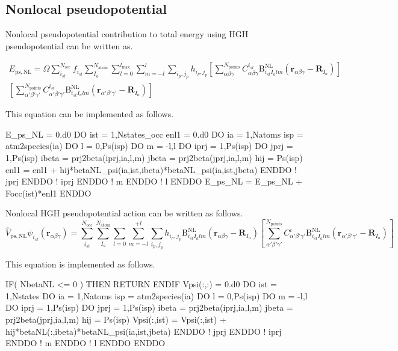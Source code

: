 \subsection{Nonlocal pseudopotential}

Nonlocal pseudopotential contribution to total energy using HGH
pseudopotential can be written as.

\begin{multline}
E_{\mathrm{ps,NL}} = \Omega \sum_{i_{st}}^{N_{\mathrm{occ}}} f_{i_{st}}
\sum_{I_{a}}^{N_{\mathrm{atom}}}
\sum_{l=0}^{l_{\mathrm{max}}} \sum_{m=-l}^{l}
\sum_{i_p,j_p} h_{i_p,j_p}
\left[
\sum_{\alpha\beta\gamma}^{N_{\mathrm{points}}}
C^{i_{st}}_{\alpha\beta\gamma} \mathrm{B}_{i_{st}I_{a}lm}^{\mathrm{NL}}\left(
\mathbf{r}_{\alpha\beta\gamma}-\mathbf{R}_{I_{a}}\right)
\right]\\
\left[
\sum_{\alpha'\beta'\gamma'}^{N_{\mathrm{points}}}
C^{i_{st}}_{\alpha'\beta'\gamma'} \mathrm{B}_{i_{st}I_{a}lm}^{\mathrm{NL}}\left(
\mathbf{r}_{\alpha'\beta'\gamma'}-\mathbf{R}_{I_{a}}\right)
\right]
\end{multline}

This equation can be implemented as follows.
\begin{fortrancode}
E_ps_NL = 0.d0
DO ist = 1,Nstates_occ
  enl1 = 0.d0
  DO ia = 1,Natoms
    isp = atm2species(ia)
    DO l = 0,Ps(isp)%
    DO m = -l,l
      DO iprj = 1,Ps(isp)%
      DO jprj = 1,Ps(isp)%
        ibeta = prj2beta(iprj,ia,l,m)
        jbeta = prj2beta(jprj,ia,l,m)
        hij = Ps(isp)%
        enl1 = enl1 + hij*betaNL_psi(ia,ist,ibeta)*betaNL_psi(ia,ist,jbeta)
      ENDDO ! jprj
      ENDDO ! iprj
    ENDDO ! m
    ENDDO ! l
  ENDDO 
  E_ps_NL = E_ps_NL + Focc(ist)*enl1
ENDDO 
\end{fortrancode}


Nonlocal HGH pseudopotential action can be written as follows.
\begin{equation}
\hat{V}_{\mathrm{ps,NL}} \psi_{i_{st}}(\mathbf{r}_{\alpha\beta\gamma}) =
\sum_{i_{st}}^{N_{\mathrm{occ}}} \sum_{I_{a}}^{N_{\mathrm{atom}}}
\sum_{l=0}\sum_{m=-l}^{+l} \sum_{i_p,j_p}
h_{i_p,j_p}
\mathrm{B}_{i_{st}I_{a}lm}^{\mathrm{NL}}\left(
\mathbf{r}_{\alpha\beta\gamma}-\mathbf{R}_{I_{a}}\right)
\left[
\sum_{\alpha'\beta'\gamma'}^{N_{\mathrm{points}}}
C^{i}_{\alpha'\beta'\gamma'} \mathrm{B}_{i_{st}I_{a}lm}^{\mathrm{NL}}\left(
\mathbf{r}_{\alpha'\beta'\gamma'}-\mathbf{R}_{I_{a}}\right)
\right]
\end{equation}

This equation is implemented as follows.
\begin{fortrancode}
IF( NbetaNL <= 0 ) THEN
  RETURN
ENDIF
Vpsi(:,:) = 0.d0
DO ist = 1,Nstates
  DO ia = 1,Natoms
    isp = atm2species(ia)
    DO l = 0,Ps(isp)%
    DO m = -l,l
      DO iprj = 1,Ps(isp)%
      DO jprj = 1,Ps(isp)%
        ibeta = prj2beta(iprj,ia,l,m)
        jbeta = prj2beta(jprj,ia,l,m)
        hij = Ps(isp)%
        Vpsi(:,ist) = Vpsi(:,ist) + hij*betaNL(:,ibeta)*betaNL_psi(ia,ist,jbeta)
      ENDDO ! jprj
      ENDDO ! iprj
    ENDDO ! m
    ENDDO ! l
  ENDDO
ENDDO
\end{fortrancode}


